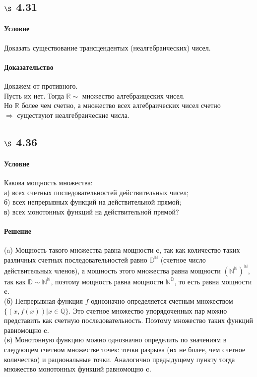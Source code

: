 \documentclass[a4paper,12pt]{article}
\begin{document}
\subsection*{$\S$ 4.31}
\paragraph*{Условие}
Доказать существование трансцендентых (неалгебраических) чисел.
\paragraph*{Доказательство}
Докажем от противного.\\
Пусть их нет. Тогда $ \mathbb{R} \sim $ множество алгебраицеских чисел.\\
Но $ \mathbb{R} $ более чем счетно, а множество всех алгебраических чисел счетно\\
$\Rightarrow$ существуют неалгебраические числа.

\subsection*{$\S$ 4.36}
\paragraph*{Условие}
Какова мощность множества:\\
а) всех счетных последовательностей действительных чисел;\\
б) всех непрерывных функций на действительной прямой;\\
в) всех монотонных функций на действительной прямой?\\
\paragraph*{Решение}
(a) Мощность такого множества равна мощности $\textbf{c}$, так как количество таких различных счетных последовательностей равно $\mathbb{D}^{\mathbb{N}}$ (счетное число действительных членов), а мощность этого множества равна мощности $(\mathbb{N}^{\mathbb{N}})^{\mathbb{N}}$, так как $\mathbb{D}\sim \mathbb{N}^{\mathbb{N}}$, поэтому мощность равна мощности $\mathbb{N}^{\mathbb{D}}$, то есть равна мощности $\textbf{c}$.\\ 
(б) Непрерывная функция $f$ однозначно определяется счетным множеством $\{(x,f(x))|x\in \mathbb{Q}\}$. Это счетное множество упорядоченных пар можно представить как счетную последовательность. Поэтому множество таких функций равномощно $\textbf{c}$.\\
(в) Монотонную функцию можно однозначно определить по значениям в следующем счетном множестве точек: точки разрыва (их не более, чем счетное количество) и рациональные точки. Аналогично предыдущему пункту тогда множество  монотонных функций равномощно $\textbf{c}$.
\end{document}
